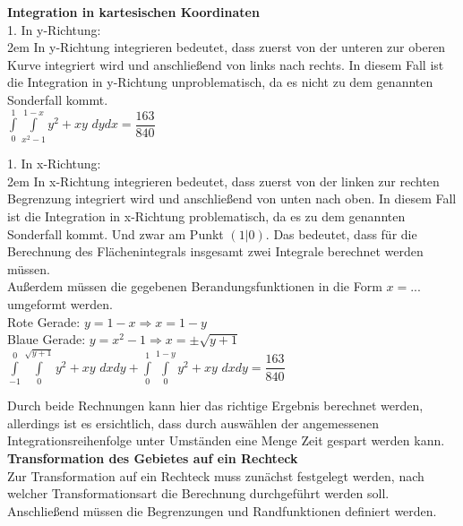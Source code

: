 \documentclass[11pt,final]{scrreprt}
\begin{document}
\textbf{Integration in kartesischen Koordinaten}\\

1. In y-Richtung:\\

\begingroup
\leftskip2em 
In y-Richtung integrieren bedeutet, dass zuerst von der unteren zur oberen Kurve integriert wird und anschließend von links nach rechts. In diesem Fall ist die Integration in y-Richtung unproblematisch, da es nicht zu dem genannten Sonderfall kommt.\\

$ \int\limits_{0}^{1}\int\limits_{x^2-1}^{1-x} y^2+xy$ $dy dx = \dfrac{163}{840} $\\
\par	
\endgroup

1. In x-Richtung:\\

\begingroup
\leftskip2em 
In x-Richtung integrieren bedeutet, dass zuerst von der linken zur rechten Begrenzung integriert wird und anschließend von unten nach oben. In diesem Fall ist die Integration in x-Richtung problematisch, da es zu dem genannten Sonderfall kommt. Und zwar am Punkt $(1|0)$. Das bedeutet, dass für die Berechnung des Flächenintegrals insgesamt zwei Integrale berechnet werden müssen.\\
Außerdem müssen die gegebenen Berandungsfunktionen in die Form $x=...$ umgeformt werden.\\
Rote Gerade: $y=1-x \Rightarrow x=1-y$\\
Blaue Gerade: $y=x^2-1 \Rightarrow x=\pm\sqrt{y+1}$\\

$ \int\limits_{-1}^{0}\int\limits_{0}^{\sqrt{y+1}} y^2+xy$ $dx dy + \int\limits_{0}^{1}\int\limits_{0}^{1-y} y^2+xy$ $dx dy= \dfrac{163}{840} $\\
\par	
\endgroup

Durch beide Rechnungen kann hier das richtige Ergebnis berechnet werden, allerdings ist es ersichtlich, dass durch auswählen der angemessenen Integrationsreihenfolge unter Umständen eine Menge Zeit gespart werden kann.\\

\textbf{Transformation des Gebietes auf ein Rechteck}\\

Zur Transformation auf ein Rechteck muss zunächst festgelegt werden, nach welcher Transformationsart die Berechnung durchgeführt werden soll. Anschließend müssen die Begrenzungen und Randfunktionen definiert werden.\\
\end{document}

